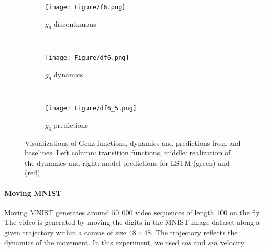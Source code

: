 \begin{figure}[htbp]
            \begin{subfigure}[b]{0.3\textwidth}
        \texttt{[image: Figure/f6.png]}
        \caption{$g_6$ discontinuous}
        \label{app:fig:f6}
    \end{subfigure}
    ~ %
    \begin{subfigure}[b]{0.3\textwidth}
        \texttt{[image: Figure/df6.png]}
        \caption{$g_6$ dynamics}
        \label{app:fig:df6}
    \end{subfigure}
    ~ %
    \begin{subfigure}[b]{0.26\textwidth}
        \texttt{[image: Figure/df6\_5.png]}
        \caption{$g_6$ predictions}
        \label{app:fig:f6}
    \end{subfigure}
%
    \caption{Visualizations of  Genz  functions,  dynamics and predictions from \tlstm{} and baselines. Left column: transition functions, middle: realization of the dynamics and right: model predictions for LSTM (green) and \tlstm{} (red).}
    \label{fig:genz}
 \vskip -0.2in
 \end{figure}




\paragraph{Moving MNIST}
%
 Moving MNIST \cite{srivastava2015unsupervised} generates around $50,000$ video sequences of length $100$ on the fly. The video is generated by moving the digits in the MNIST image dataset along a given trajectory  within a canvas of size $48\times 48$. The trajectory reflects the dynamics of the movement. In this experiment, we used $cos$ and $sin$ velocity. 






%

